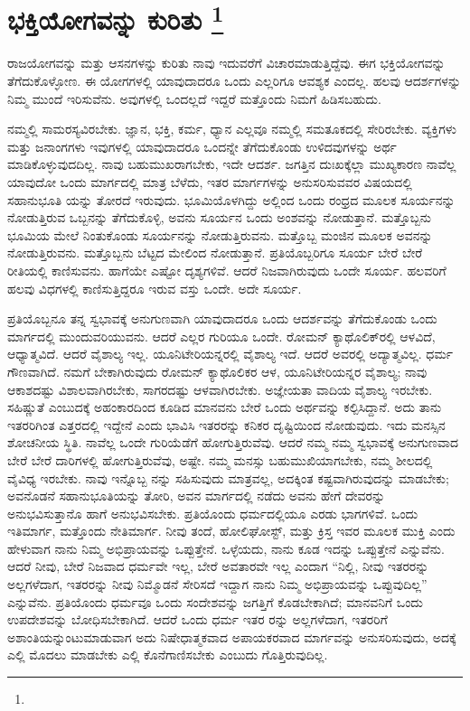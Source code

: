 
\chapter[ಭಕ್ತಿಯೋಗವನ್ನು ಕುರಿತು ]{ಭಕ್ತಿಯೋಗವನ್ನು ಕುರಿತು \protect\footnote{}}

ರಾಜಯೋಗವನ್ನು ಮತ್ತು ಆಸನಗಳನ್ನು ಕುರಿತು ನಾವು ಇದುವರೆಗೆ ವಿಚಾರಮಾಡುತ್ತಿದ್ದೆವು. ಈಗ ಭಕ್ತಿಯೋಗವನ್ನು ತೆಗೆದುಕೊಳ್ಳೋಣ. ಈ ಯೋಗಗಳಲ್ಲಿ ಯಾವುದಾದರೂ ಒಂದು ಎಲ್ಲರಿಗೂ ಆವಶ್ಯಕ ಎಂದಲ್ಲ. ಹಲವು ಆದರ್ಶಗಳನ್ನು ನಿಮ್ಮ ಮುಂದೆ ಇರಿಸುವೆನು. ಅವುಗಳಲ್ಲಿ ಒಂದಲ್ಲದೆ ಇದ್ದರೆ ಮತ್ತೊಂದು ನಿಮಗೆ ಹಿಡಿಸಬಹುದು.

ನಮ್ಮಲ್ಲಿ ಸಾಮರಸ್ಯವಿರಬೇಕು. ಜ್ಞಾನ, ಭಕ್ತಿ, ಕರ್ಮ, ಧ್ಯಾನ ಎಲ್ಲವೂ ನಮ್ಮಲ್ಲಿ ಸಮತೂಕದಲ್ಲಿ ಸೇರಿರಬೇಕು. ವ್ಯಕ್ತಿಗಳು ಮತ್ತು ಜನಾಂಗಗಳು ಇವುಗಳಲ್ಲಿ ಯಾವುದಾದರೂ ಒಂದನ್ನೇ ತೆಗೆದುಕೊಂಡು ಉಳಿದವುಗಳನ್ನು ಅರ್ಥ ಮಾಡಿಕೊಳ್ಳುವುದದಿಲ್ಲ. ನಾವು ಬಹುಮುಖರಾಗಬೇಕು, ಇದೇ ಆದರ್ಶ. ಜಗತ್ತಿನ ದುಃಖಕ್ಕೆಲ್ಲಾ ಮುಖ್ಯಕಾರಣ ನಾವೆಲ್ಲ ಯಾವುದೋ ಒಂದು ಮಾರ್ಗದಲ್ಲಿ ಮಾತ್ರ ಬೆಳೆದು, ಇತರ ಮಾರ್ಗಗಳನ್ನು ಅನುಸರಿಸುವವರ ವಿಷಯದಲ್ಲಿ ಸಹಾನುಭೂತಿ ಯನ್ನು ತೋರದೆ ಇರುವುದು. ಭೂಮಿಯೊಳಗಿದ್ದು ಅಲ್ಲಿಂದ ಒಂದು ರಂಧ್ರದ ಮೂಲಕ ಸೂರ್ಯನನ್ನು ನೋಡುತ್ತಿರುವ ಒಬ್ಬನನ್ನು ತೆಗೆದುಕೊಳ್ಳಿ, ಅವನು ಸೂರ್ಯನ ಒಂದು ಅಂಶವನ್ನು ನೋಡುತ್ತಾನೆ. ಮತ್ತೊಬ್ಬನು ಭೂಮಿಯ ಮೇಲೆ ನಿಂತುಕೊಂಡು ಸೂರ್ಯನನ್ನು ನೋಡುತ್ತಿರುವನು. ಮತ್ತೊಬ್ಬ ಮಂಜಿನ ಮೂಲಕ ಅವನನ್ನು ನೋಡುತ್ತಿರುವನು. ಮತ್ತೊಬ್ಬನು ಬೆಟ್ಟದ ಮೇಲಿಂದ ನೋಡುತ್ತಾನೆ. ಪ್ರತಿಯೊಬ್ಬರಿಗೂ ಸೂರ್ಯ ಬೇರೆ ಬೇರೆ ರೀತಿಯಲ್ಲಿ ಕಾಣಿಸುವನು. ಹಾಗೆಯೇ ಎಷ್ಟೋ ದೃಶ್ಯಗಳಿವೆ. ಆದರೆ ನಿಜವಾಗಿರುವುದು ಒಂದೇ ಸೂರ್ಯ. ಹಲವರಿಗೆ ಹಲವು ವಿಧಗಳಲ್ಲಿ ಕಾಣಿಸುತ್ತಿದ್ದರೂ ಇರುವ ವಸ್ತು ಒಂದೇ. ಅದೇ ಸೂರ್ಯ.

ಪ್ರತಿಯೊಬ್ಬನೂ ತನ್ನ ಸ್ವಭಾವಕ್ಕೆ ಅನುಗುಣವಾಗಿ ಯಾವುದಾದರೂ ಒಂದು ಆದರ್ಶವನ್ನು ತೆಗೆದುಕೊಂಡು ಒಂದು ಮಾರ್ಗದಲ್ಲಿ ಮುಂದುವರಿಯುವನು. ಆದರೆ ಎಲ್ಲರ ಗುರಿಯೂ ಒಂದೇ. ರೋಮನ್​ ಕ್ಯಾಥೊಲಿಕ್​ರಲ್ಲಿ ಆಳವಿದೆ, ಆಧ್ಯಾತ್ಮವಿದೆ. ಆದರೆ ವೈಶಾಲ್ಯ ಇಲ್ಲ. ಯೂನಿಟೇರಿಯನ್ನರಲ್ಲಿ ವೈಶಾಲ್ಯ ಇದೆ. ಆದರೆ ಅವರಲ್ಲಿ ಅದ್ಯಾತ್ಮವಿಲ್ಲ. ಧರ್ಮ ಗೌಣವಾಗಿದೆ. ನಮಗೆ ಬೇಕಾಗಿರುವುದು ರೋಮನ್​ ಕ್ಯಾಥೊಲಿಕರ ಆಳ, ಯೂನಿಟೇರಿಯನ್ನರ ವೈಶಾಲ್ಯ; ನಾವು ಆಕಾಶದಷ್ಟು ವಿಶಾಲವಾಗಿರಬೇಕು, ಸಾಗರದಷ್ಟು ಆಳವಾಗಿರಬೇಕು. ಅಜ್ಞೇಯತಾ ವಾದಿಯ ವೈಶಾಲ್ಯ ಇರಬೇಕು. ಸಹಿಷ್ಣುತೆ ಎಂಬುದಕ್ಕೆ ಅಹಂಕಾರದಿಂದ ಕೂಡಿದ ಮಾನವನು ಬೇರೆ ಒಂದು ಅರ್ಥವನ್ನು ಕಲ್ಪಿಸಿದ್ದಾನೆ. ಅದು ತಾನು ಇತರರಿಗಿಂತ ಎತ್ತರದಲ್ಲಿ ಇದ್ದೇನೆ ಎಂದು ಭಾವಿಸಿ ಇತರರನ್ನು ಕನಿಕರ ದೃಷ್ಟಿಯಿಂದ ನೋಡುವುದು. ಇದು ಮನಸ್ಸಿನ ಶೋಚನೀಯ ಸ್ಥಿತಿ. ನಾವೆಲ್ಲ ಒಂದೇ ಗುರಿಯೆಡೆಗೆ ಹೋಗುತ್ತಿರುವೆವು. ಆದರೆ ನಮ್ಮ ನಮ್ಮ ಸ್ವಭಾವಕ್ಕೆ ಅನುಗುಣವಾದ ಬೇರೆ ಬೇರೆ ದಾರಿಗಳಲ್ಲಿ ಹೋಗುತ್ತಿರುವೆವು, ಅಷ್ಟೇ. ನಮ್ಮ ಮನಸ್ಸು ಬಹುಮುಖಿಯಾಗಬೇಕು, ನಮ್ಮ ಶೀಲದಲ್ಲಿ ವೈವಿಧ್ಯ ಇರಬೇಕು. ನಾವು ಇನ್ನೊಬ್ಬ ನನ್ನು ಸಹಿಸುವುದು ಮಾತ್ರವಲ್ಲ, ಅದಕ್ಕಿಂತ ಕಷ್ಟವಾಗಿರುವುದನ್ನು ಮಾಡಬೇಕು; ಅವನೊಡನೆ ಸಹಾನುಭೂತಿಯನ್ನು ತೋರಿ, ಅವನ ಮಾರ್ಗದಲ್ಲಿ ನಡೆದು ಅವನು ಹೇಗೆ ದೇವರನ್ನು ಅನುಭವಿಸುತ್ತಾನೊ ಹಾಗೆ ಅನುಭವಿಸಬೇಕು. ಪ್ರತಿಯೊಂದು ಧರ್ಮದಲ್ಲಿಯೂ ಎರಡು ಭಾಗಗಳಿವೆ. ಒಂದು ಇತಿಮಾರ್ಗ, ಮತ್ತೊಂದು ನೇತಿಮಾರ್ಗ. ನೀವು ತಂದೆ, ಹೋಲಿಘೋಸ್ಟ್​, ಮತ್ತು ಕ್ರಿಸ್ತ ಇವರ ಮೂಲಕ ಮುಕ್ತಿ ಎಂದು ಹೇಳುವಾಗ ನಾನು ನಿಮ್ಮ ಅಭಿಪ್ರಾಯವನ್ನು ಒಪ್ಪುತ್ತೇನೆ. ಒಳ್ಳೆಯದು, ನಾನು ಕೂಡ ಇದನ್ನು ಒಪ್ಪುತ್ತೇನೆ ಎನ್ನುವೆನು. ಆದರೆ ನೀವು, ಬೇರೆ ನಿಜವಾದ ಧರ್ಮವೇ ಇಲ್ಲ, ಬೇರೆ ಅವತಾರವೇ ಇಲ್ಲ ಎಂದಾಗ “ನಿಲ್ಲಿ, ನೀವು ಇತರರನ್ನು ಅಲ್ಲಗಳೆದಾಗ, ಇತರರನ್ನು ನೀವು ನಿಮ್ಮೊಡನೆ ಸೇರಿಸದೆ ಇದ್ದಾಗ ನಾನು ನಿಮ್ಮ ಅಭಿಪ್ರಾಯವನ್ನು ಒಪ್ಪುವುದಿಲ್ಲ” ಎನ್ನುವೆನು. ಪ್ರತಿಯೊಂದು ಧರ್ಮವೂ ಒಂದು ಸಂದೇಶವನ್ನು ಜಗತ್ತಿಗೆ ಕೊಡಬೇಕಾಗಿದೆ; ಮಾನವನಿಗೆ ಒಂದು ಉಪದೇಶವನ್ನು ಬೋಧಿಸಬೇಕಾಗಿದೆ. ಆದರೆ ಒಂದು ಧರ್ಮ ಇತರ ರನ್ನು ಅಲ್ಲಗಳೆದಾಗ, ಇತರರಿಗೆ ಅಶಾಂತಿಯನ್ನುಂಟುಮಾಡುವಾಗ ಅದು ನಿಷೇಧಾತ್ಮಕವಾದ ಅಪಾಯಕರವಾದ ಮಾರ್ಗವನ್ನು ಅನುಸರಿಸುವುದು, ಅದಕ್ಕೆ ಎಲ್ಲಿ ಮೊದಲು ಮಾಡಬೇಕು ಎಲ್ಲಿ ಕೊನೆಗಾಣಿಸಬೇಕು ಎಂಬುದು ಗೊತ್ತಿರುವುದಿಲ್ಲ.

